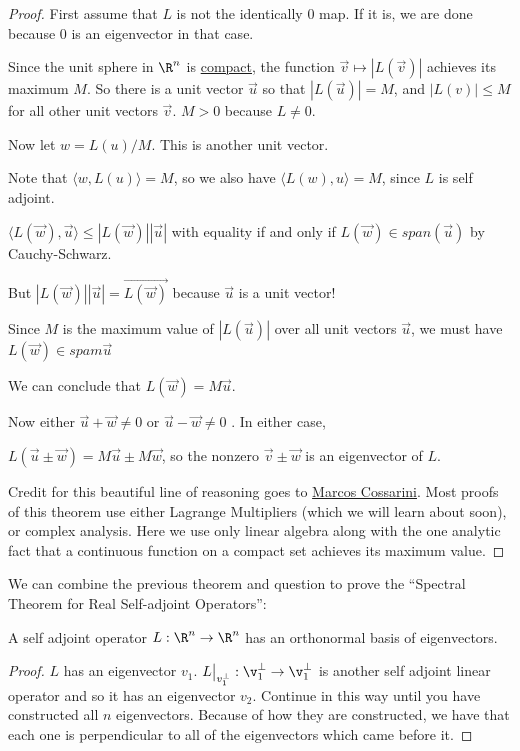 \begin{proof}
	First assume that $L$ is not the identically $0$ map.  If it is, we are done because $0$ is an eigenvector in that case.
	
	Since the unit sphere in $\R^n$ is \href{http://en.wikipedia.org/wiki/Compact_space}{compact},
	 the function $\vec{v} \mapsto |L(\vec{v})|$ achieves its maximum $M$.  So there is a unit vector 
	$\vec{u}$ so that $|L(\vec{u})| = M$, and $|L(v)| \leq M$ for all other unit vectors $\vec{v}$.  $M > 0$ because $L \neq 0$.
	
	Now let $w = L(u)/M$.  This is another unit vector.
	
	Note that $\langle w, L(u)\rangle = M$, so we also have $\langle L(w), u \rangle = M$, since $L$ is self adjoint.
	
	$\langle L(\vec{w}),\vec{u}\rangle \leq |L(\vec{w})||\vec{u}|$ with equality if and only if $L(\vec{w}) \in span(\vec{u})$ by Cauchy-Schwarz.
	
	But $|L(\vec{w})||\vec{u}| = \vec{L(\vec{w})}$ because $\vec{u}$ is a unit vector!
		
	Since $M$ is the maximum value of $|L(\vec{u})|$ over all unit vectors $\vec{u}$, we must have  $L(\vec{w}) \in spam{\vec{u}}$
	
	We can conclude that $L(\vec{w}) = M\vec{u}$.
	
	Now either $\vec{u}+\vec{w} \neq 0$ or $\vec{u}-\vec{w} \neq 0$ .  In either case,
	
	$L(\vec{u} \pm \vec{w}) = M\vec{u} \pm M\vec{w}$, so the nonzero $\vec{v} \pm \vec{w}$ is an eigenvector of $L$.
	
	Credit for this beautiful line of reasoning goes to \href{http://mathoverflow.net/a/118759/1106}{Marcos Cossarini}.  Most proofs of this theorem use either 
	Lagrange Multipliers (which we will learn about soon), or complex analysis.  Here we use only linear algebra along with the one analytic fact that a continuous 
	function on a compact set achieves its maximum value.
\end{proof}

	We can combine the previous theorem and question to prove the ``Spectral Theorem for Real Self-adjoint Operators'':  
	
	\begin{theorem}
		A self adjoint operator $L : \R^n \to \R^n$ has an orthonormal basis of eigenvectors.
	\end{theorem}
	
\begin{proof}
	$L$ has an eigenvector $v_1$.  $L\big|_{v_1^\perp} : \v_1^\perp \to \v_1^\perp$  is another self adjoint linear operator and so it has an eigenvector $v_2$.  
	Continue in this way until you have constructed all $n$ eigenvectors.  Because of how they are constructed, we have that each one is perpendicular to all of the 
	eigenvectors which came before it. 
\end{proof}

